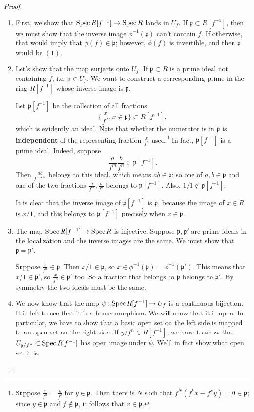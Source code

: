 \begin{proof} 
\begin{enumerate}
\item First, we show that $\operatorname{Spec} R[f^{-1}] \to \operatorname{Spec} R$ lands in $U_f$. If
$\mathfrak{p} \subset R[f^{-1}]$, then we must show that the inverse image
$\phi^{-1}(\mathfrak{p})$ can't contain $f$. If otherwise, that would imply that
$\phi(f) \in \mathfrak{p}$; however, $\phi(f)$ is invertible, and then
$\mathfrak{p}$ would be $(1)$.  
\item Let's show that the map surjects onto $U_f$. If $\mathfrak{p} \subset R$ is a prime
ideal not containing $f$, i.e. $\mathfrak{p} \in U_f$. We want to construct a
corresponding prime in the ring $R[f^{-1}]$ whose inverse image is $\mathfrak{p}$.

Let $\mathfrak{p}[f^{-1}]$ be the collection of all fractions
\[ \{\frac{x}{f^n}, x \in \mathfrak{p}\} \subset R[f^{-1}],  \]
which is evidently an ideal. Note that whether the numerator is in
$\mathfrak{p}$ is \textbf{independent} of the
representing fraction $\frac{x}{f^n}$ used.\footnote{Suppose $\frac{x}{f^n} =
\frac{y}{f^k}$ for $y \in \mathfrak{p}$. Then there is $N$ such that
$f^N(f^k x - f^n y) = 0 \in \mathfrak{p}$; since $y \in \mathfrak{p}$ and $f
\notin \mathfrak{p}$, it follows that $x \in \mathfrak{p}$.}
In fact, $\mathfrak{p}[f^{-1}]$ is a prime ideal. Indeed, suppose 
\[  \frac{a}{f^m} \frac{b}{f^n} \in \mathfrak{p}[f^{-1}] .\]
Then $\frac{ab}{f^{m+n}}$ belongs to this ideal, which means $ab \in
\mathfrak{p}$; so one of $a,b \in \mathfrak{p}$ and one of the two fractions
$\frac{a}{f^m}, \frac{b}{f^n}$ belongs to $\mathfrak{p}[f^{-1}]$. Also, $1/1
\notin \mathfrak{p}[f^{-1}]$.

It is clear that the inverse image of $\mathfrak{p}[f^{-1}]$ is $\mathfrak{p}$,
because the image of $x \in R$ is $x/1$, and this belongs to
$\mathfrak{p}[f^{-1}]$ precisely when $x \in \mathfrak{p}$.
\item The map $\operatorname{Spec} R[f^{-1}] \to \operatorname{Spec} R$ is injective. Suppose
$\mathfrak{p}, \mathfrak{p'}$ are prime ideals in the localization and the
inverse images are the same.  
We must show that $\mathfrak{p} = \mathfrak{p'}$.

Suppose $\frac{x}{f^n} \in \mathfrak{p}$.  Then $x/1 \in \mathfrak{p}$, so $x
\in \phi^{-1}(\mathfrak{p}) = \phi^{-1}(\mathfrak{p}')$.  This means that $x/1
\in \mathfrak{p}'$, so 
$\frac{x}{f^n} \in \mathfrak{p}'$ too.  So a fraction that belongs to
$\mathfrak{p}$ belongs to $\mathfrak{p}'$. By symmetry the two ideals must be
the same.  
\item We now know that the map $\psi: \operatorname{Spec} R[f^{-1}] \to U_f$ is a continuous
bijection. It is left to see that it is a homeomorphism.  We will show that it
is open.  
In particular, we have to show that a basic open set on the left side is mapped
to an open set on the right side.
If $y/f^n \in R[f^{-1}]$, we have to show that $U_{y/f^n} \subset \operatorname{Spec}
R[f^{-1}]$ has open image under $\psi$.  We'll in fact show what open set it is.


\end{enumerate}
\end{proof}
